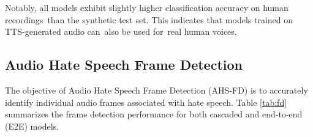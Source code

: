\documentclass[11pt]{article}
\begin{document}
Notably, all models exhibit slightly higher classification accuracy on human recordings than the synthetic test set. This indicates that models trained on TTS-generated audio can also be used for real human voices.


\begin{table}[t]
\centering
{}
\caption{Result of Audio Hate Speech Frame Detection (AHS-FD) on AudioHateXplain test sets.}
\label{tab:fd}
\end{table}

\subsection{Audio Hate Speech Frame Detection}

The objective of Audio Hate Speech Frame Detection (AHS-FD) is to accurately identify individual audio frames associated with hate speech. Table \ref{tab:fd} summarizes the frame detection performance for both cascaded and end-to-end (E2E) models.
\end{document}
